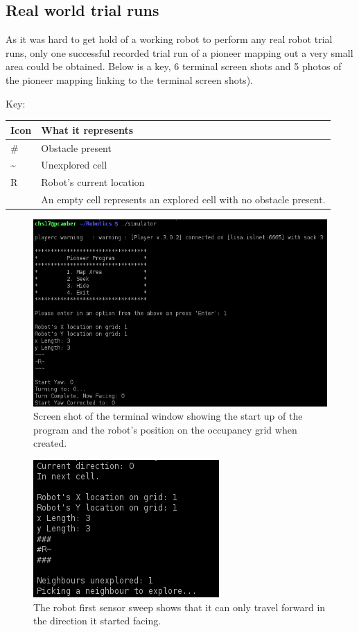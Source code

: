 \documentclass[a4paper,12pt]{article}
\begin{document}
\subsection{Real world trial runs}
\noindent As it was hard to get hold of a working robot to perform any real robot trial runs, only one successful recorded trial run of a pioneer mapping out a very small area could be obtained. Below is a key, 6 terminal screen shots and 5 photos of the pioneer mapping linking to the terminal screen shots).

\vspace{5mm}
\noindent Key:
\begin{table}[H]
\begin{tabular}{| l | l |}
	\hline
	\textbf{Icon} & \textbf{What it represents}
	\\\hline
	\# & Obstacle present
	\\\hline
	\textasciitilde & Unexplored cell
	\\\hline
	R & Robot's current location
	\\\hline
	 & An empty cell represents an explored cell with no obstacle present.
	\\\hline
\end{tabular}
\end{table}

\begin{figure}[H]
\includegraphics[scale=0.9]{RealRunStart.png}
\caption{Screen shot of the terminal window showing the start up of the program and the robot's position on the occupancy grid when created.}
\end{figure}

\begin{figure}[H]
\includegraphics[scale=1.0]{RealRunT1.png}
\caption{The robot first sensor sweep shows that it can only travel forward in the direction it started facing.}
\end{figure}
\end{document}
